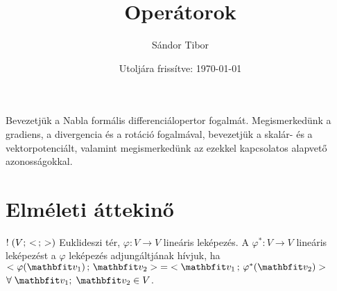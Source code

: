 \documentclass[lang=magyar]{math-handout}
\title{Operátorok}
\date{Utoljára frissítve: \today}
\author{Sándor Tibor}
\begin{document}
\allowdisplaybreaks

\maketitle

\vspace{1em}

\begin{summary}
  Bevezetjük a Nabla formális differenciálopertor fogalmát. Megismerkedünk a
  gradiens, a divergencia és a rotáció fogalmával, bevezetjük a skalár- és a
  vektorpotenciált, valamint megismerkedünk az ezekkel kapcsolatos alapvető
  azonosságokkal.
\end{summary}

\vspace{-1em}

\section{Elméleti áttekinő}

\begin{definition}
  $! \; (V; \, <  \, ; \,  >)$ Euklideszi tér, $\varphi: V \rightarrow V$ lineáris
  leképezés. A $\varphi^{*} : V \rightarrow V$ lineáris leképezést a $\varphi$
  leképezés adjungáltjának hívjuk, ha $\scalar{\varphi(\rvec{v}_1)}{\rvec{v}_2}
    \; = \; \scalar{\rvec{v}_1}{\varphi^{*}(\rvec{v}_2)}$ $\forall \; \rvec{v}_1
    ;\; \rvec{v}_2 \in V$.
\end{definition}
\end{document}
